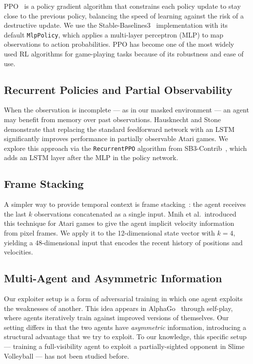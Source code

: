 \documentclass[conference]{IEEEtran}
\begin{document}
PPO~\cite{schulman2017proximal} is a policy gradient algorithm that constrains each policy update to stay close to the previous policy, balancing the speed of learning against the risk of a destructive update. We use the Stable-Baselines3~\cite{raffin2021stable} implementation with its default \texttt{MlpPolicy}, which applies a multi-layer perceptron (MLP) to map observations to action probabilities. PPO has become one of the most widely used RL algorithms for game-playing tasks because of its robustness and ease of use.

\subsection{Recurrent Policies and Partial Observability}

When the observation is incomplete --- as in our masked environment --- an agent may benefit from memory over past observations. Hausknecht and Stone~\cite{hausknecht2015deep} demonstrate that replacing the standard feedforward network with an LSTM significantly improves performance in partially observable Atari games. We explore this approach via the \texttt{RecurrentPPO} algorithm from SB3-Contrib~\cite{sb3contrib}, which adds an LSTM layer after the MLP in the policy network.

\subsection{Frame Stacking}

A simpler way to provide temporal context is frame stacking~\cite{mnih2015human}: the agent receives the last $k$ observations concatenated as a single input. Mnih et al.\ introduced this technique for Atari games to give the agent implicit velocity information from pixel frames. We apply it to the 12-dimensional state vector with $k=4$, yielding a 48-dimensional input that encodes the recent history of positions and velocities.

\subsection{Multi-Agent and Asymmetric Information}

Our exploiter setup is a form of adversarial training in which one agent exploits the weaknesses of another. This idea appears in AlphaGo~\cite{silver2016mastering} through self-play, where agents iteratively train against improved versions of themselves. Our setting differs in that the two agents have \emph{asymmetric} information, introducing a structural advantage that we try to exploit. To our knowledge, this specific setup --- training a full-visibility agent to exploit a partially-sighted opponent in Slime Volleyball --- has not been studied before.
\end{document}

